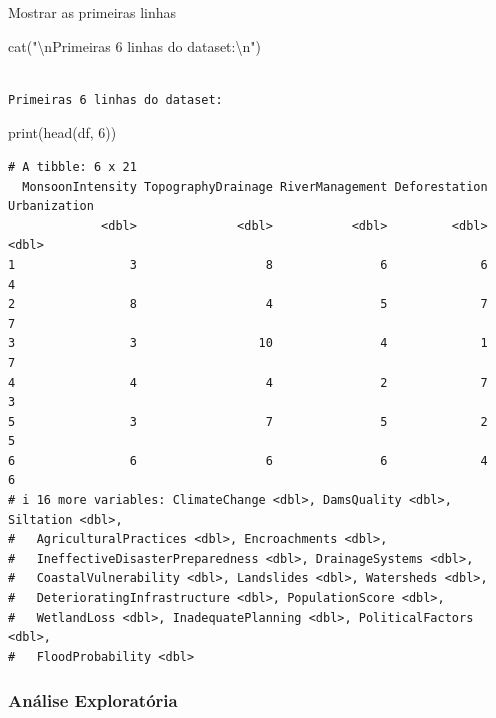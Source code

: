 \documentclass[
  letterpaper,
  DIV=11,
  numbers=noendperiod]{scrartcl}
\newenvironment{Shaded}{\begin{snugshade}}{\end{snugshade}}
\newcommand{\DecValTok}[1]{\textcolor[rgb]{0.68,0.00,0.00}{#1}}
\newcommand{\FunctionTok}[1]{\textcolor[rgb]{0.28,0.35,0.67}{#1}}
\newcommand{\NormalTok}[1]{\textcolor[rgb]{0.00,0.23,0.31}{#1}}
\newcommand{\SpecialCharTok}[1]{\textcolor[rgb]{0.37,0.37,0.37}{#1}}
\newcommand{\StringTok}[1]{\textcolor[rgb]{0.13,0.47,0.30}{#1}}
\begin{document}
Mostrar as primeiras linhas

\begin{Shaded}
\begin{Highlighting}[]
\FunctionTok{cat}\NormalTok{(}\StringTok{"}\SpecialCharTok{\textbackslash{}n}\StringTok{Primeiras 6 linhas do dataset:}\SpecialCharTok{\textbackslash{}n}\StringTok{"}\NormalTok{)}
\end{Highlighting}
\end{Shaded}

\begin{verbatim}

Primeiras 6 linhas do dataset:
\end{verbatim}

\begin{Shaded}
\begin{Highlighting}[]
\FunctionTok{print}\NormalTok{(}\FunctionTok{head}\NormalTok{(df, }\DecValTok{6}\NormalTok{))}
\end{Highlighting}
\end{Shaded}

\begin{verbatim}
# A tibble: 6 x 21
  MonsoonIntensity TopographyDrainage RiverManagement Deforestation Urbanization
             <dbl>              <dbl>           <dbl>         <dbl>        <dbl>
1                3                  8               6             6            4
2                8                  4               5             7            7
3                3                 10               4             1            7
4                4                  4               2             7            3
5                3                  7               5             2            5
6                6                  6               6             4            6
# i 16 more variables: ClimateChange <dbl>, DamsQuality <dbl>, Siltation <dbl>,
#   AgriculturalPractices <dbl>, Encroachments <dbl>,
#   IneffectiveDisasterPreparedness <dbl>, DrainageSystems <dbl>,
#   CoastalVulnerability <dbl>, Landslides <dbl>, Watersheds <dbl>,
#   DeterioratingInfrastructure <dbl>, PopulationScore <dbl>,
#   WetlandLoss <dbl>, InadequatePlanning <dbl>, PoliticalFactors <dbl>,
#   FloodProbability <dbl>
\end{verbatim}

\subsubsection{Análise Exploratória}\label{anuxe1lise-exploratuxf3ria}
\end{document}

